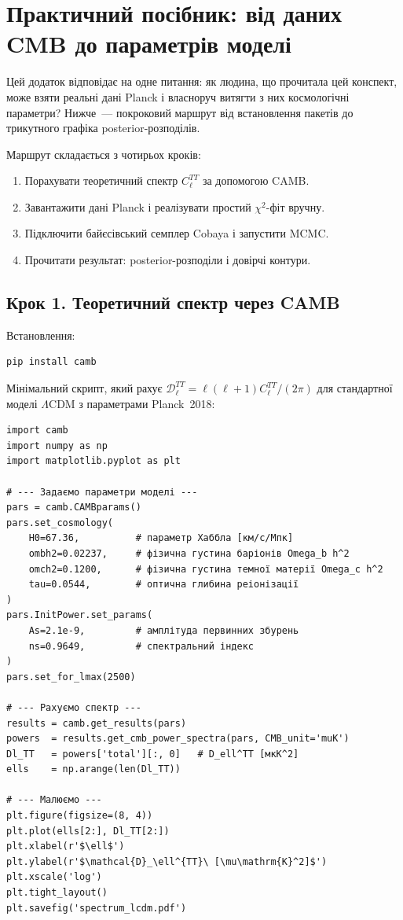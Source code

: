 
\chapter{Практичний посібник: від даних CMB до параметрів моделі}
\label{sec:practical}

Цей додаток відповідає на одне питання: як людина, що прочитала
цей конспект, може взяти реальні дані Planck і власноруч
витягти з них космологічні параметри? Нижче~--- покроковий
маршрут від встановлення пакетів до трикутного графіка
posterior-розподілів.

Маршрут складається з чотирьох кроків:
\begin{enumerate}
  \item Порахувати теоретичний спектр $C_\ell^{TT}$ за допомогою CAMB.
  \item Завантажити дані Planck і реалізувати простий $\chi^2$-фіт вручну.
  \item Підключити байєсівський семплер Cobaya і запустити MCMC.
  \item Прочитати результат: posterior-розподіли і довірчі контури.
\end{enumerate}

\section{Крок 1. Теоретичний спектр через CAMB}

Встановлення:
\begin{verbatim}
pip install camb
\end{verbatim}

Мінімальний скрипт, який рахує $\mathcal{D}_\ell^{TT}
= \ell(\ell+1)C_\ell^{TT}/(2\pi)$ для стандартної моделі
$\Lambda$CDM з параметрами Planck~2018:

\begin{verbatim}
import camb
import numpy as np
import matplotlib.pyplot as plt

# --- Задаємо параметри моделі ---
pars = camb.CAMBparams()
pars.set_cosmology(
    H0=67.36,          # параметр Хаббла [км/с/Мпк]
    ombh2=0.02237,     # фізична густина баріонів Omega_b h^2
    omch2=0.1200,      # фізична густина темної матерії Omega_c h^2
    tau=0.0544,        # оптична глибина реіонізації
)
pars.InitPower.set_params(
    As=2.1e-9,         # амплітуда первинних збурень
    ns=0.9649,         # спектральний індекс
)
pars.set_for_lmax(2500)

# --- Рахуємо спектр ---
results = camb.get_results(pars)
powers  = results.get_cmb_power_spectra(pars, CMB_unit='muK')
Dl_TT   = powers['total'][:, 0]   # D_ell^TT [мкК^2]
ells    = np.arange(len(Dl_TT))

# --- Малюємо ---
plt.figure(figsize=(8, 4))
plt.plot(ells[2:], Dl_TT[2:])
plt.xlabel(r'$\ell$')
plt.ylabel(r'$\mathcal{D}_\ell^{TT}\ [\mu\mathrm{K}^2]$')
plt.xscale('log')
plt.tight_layout()
plt.savefig('spectrum_lcdm.pdf')
\end{verbatim}

